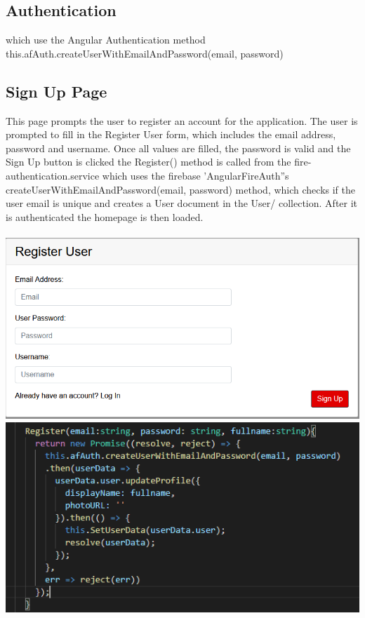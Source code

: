 \subsection{Authentication}
 which use the Angular Authentication method  this.afAuth.createUserWithEmailAndPassword(email, password)

\subsection{Sign Up Page}
This page prompts the user to register an account for the application. The user is prompted to fill in the Register User form, which includes the email address, password and username. Once all values are filled, the password is valid and the Sign Up button is clicked the Register() method is called from the fire-authentication.service which uses the firebase 'AngularFireAuth''s createUserWithEmailAndPassword(email, password) method, which checks if the user email is unique and creates a User document in the User/ collection. After it is authenticated the homepage is then loaded.
\\\\
\includegraphics[scale=0.3]{./img/SignUpPage.png} 
\includegraphics[scale=0.4]{./img/Register.png}\\
